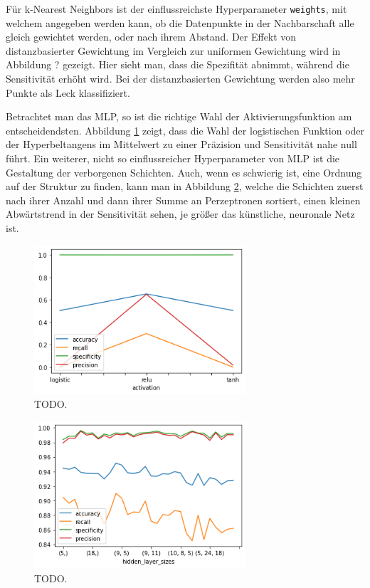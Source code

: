 Für k-Nearest Neighbors ist der einflussreichste Hyperparameter \texttt{weights}, mit welchem angegeben werden
 kann, ob die Datenpunkte in der Nachbarschaft alle gleich gewichtet werden, oder nach ihrem Abstand. Der Effekt
 von distanzbasierter Gewichtung im Vergleich zur uniformen Gewichtung wird in Abbildung ? gezeigt. Hier sieht
 man, dass die Spezifität abnimmt, während die Sensitivität erhöht wird. Bei der distanzbasierten Gewichtung
 werden also mehr Punkte als Leck klassifiziert.

Betrachtet man das MLP, so ist die richtige Wahl der Aktivierungsfunktion am entscheidendsten. Abbildung
 \ref{fig:res-mlp-activation} zeigt, dass die Wahl der logistischen Funktion oder der Hyperbeltangens im
 Mittelwert zu einer Präzision und Sensitivität nahe null führt. Ein weiterer, nicht so einflussreicher
 Hyperparameter von MLP ist die Gestaltung der verborgenen Schichten. Auch, wenn es schwierig ist, eine Ordnung
 auf der Struktur zu finden, kann man in Abbildung \ref{fig:res-mlp-layers}, welche die Schichten zuerst nach
 ihrer Anzahl und dann ihrer Summe an Perzeptronen sortiert, einen kleinen Abwärtstrend in der Sensitivität
 sehen, je größer das künstliche, neuronale Netz ist.

\begin{figure}
    \centering
    \includegraphics[width=0.7\textwidth]{res/res-mlp-activation}
    \caption{TODO.}
    \label{fig:res-mlp-activation}
\end{figure}

\begin{figure}
    \centering
    \includegraphics[width=0.7\textwidth]{res/res-mlp-layers}
    \caption{TODO.}
    \label{fig:res-mlp-layers}
\end{figure}


